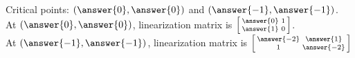 \documentclass{ximera}
\begin{document}
\begin{exercise}
\begin{itemize}
            Critical points: $\left(\answer{0},\answer{0}\right)$ and $\left(\answer{-1}, \answer{-1}\right)$. \\
            At $\left(\answer{0},\answer{0}\right)$, linearization matrix is $\left[\begin{smallmatrix} \answer{0} & 1 \\ \answer{1} & 0 \end{smallmatrix}\right]$. \\
            At $\left(\answer{-1}, \answer{-1}\right)$, linearization matrix is $\left[\begin{smallmatrix} \answer{-2} & \answer{1} \\ 1 & \answer{-2} \end{smallmatrix}\right]$\\
    \end{itemize}
\end{exercise}
\end{document}
